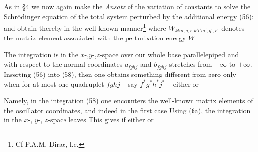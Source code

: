 \begin{paper}{1}
As in \S4 we now again make the \textit{Ansatz} of the variation of constants to solve the Schr\"odinger equation of the total system perturbed by the additional energy (56):
and obtain thereby in the well-known manner\footnote{Cf P.A.M. Dirac, l.c.}
where $W_{klm,q,r;k'l'm',q',r'}$ denotes the matrix element associated with the perturbation energy $W$

The integration is in the $x$-,$y$-,$z$-space over our whole base parallelepiped and with respect to the normal coordinates $a_{fghj}$ and $b_{fghj}$ stretches from $-\infty$ to $+\infty$. Inserting (56) into (58), then one obtains something different from zero only when for at most one quadruplet $fghj$ -- say $f^*g^*h^*j^*$ -- either
or

Namely, in the integration (58) one encounters the well-known matrix elements of the oscillator coordinates, and indeed in the first case
Using (6a), the integration in the $x$-, $y$-, $z$-space leaves
This gives
if either
or


\end{paper}
